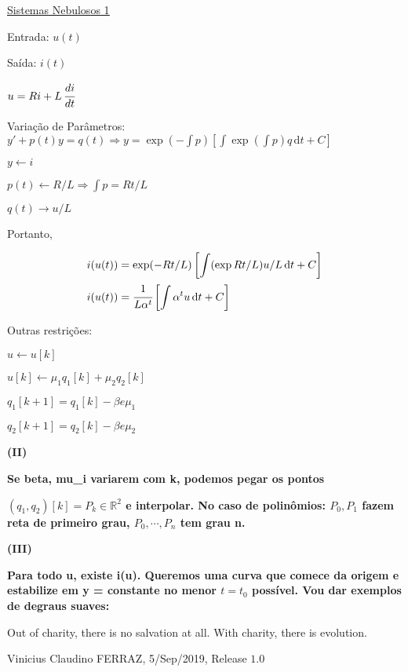 \documentclass[12pt]{article}
\begin{document}
\Large

\begin{center}
\href{https://www.youtube.com/watch?v=2E0TYW42x1c}{\color{blue}\underline{Sistemas Nebulosos 1}}
\end{center}

\normalsize

\vspace{3mm}

Entrada: $u(t)$

Sa\'ida: $i(t)$

$u = Ri + L\, \cfrac{di}{dt}$

Varia\c{c}\~ao de Par\^ametros: $y' + p(t) y = q(t) \Rightarrow y = \exp(-\int p) \left[ \int \exp (\int p) q \,\mathrm{d}t + C \right]$

$y \leftarrow i$

$p(t) \leftarrow R/L \Rightarrow \int p = Rt/L$

$q(t) \rightarrow u/L$

Portanto,

\begin{align}
 i(u(t)) &= \exp(-Rt/L) \left[ \int (\exp Rt/L) u/L \,\mathrm{d}t + C \right] \\
 i(u(t)) &= \cfrac{1}{L \alpha^t} \left[ \int \alpha^t u \,\mathrm{d}t + C \right]
\end{align}

Outras restri\c{c}\~oes:

$u \leftarrow u[k]$

$u[k] \leftarrow \mu_1 q_1[k] + \mu_2 q_2[k]$

$q_1[k+1] = q_1[k] - \beta e \mu_1$

$q_2[k+1] = q_2[k] - \beta e \mu_2$

\vspace{3mm}

\textbf{(II)}

\textbf{Se beta, mu\_i variarem com k, podemos pegar os pontos}

\textbf{$(q_1, q_2)[k] = P_k \in \mathbb{R}^2$ e interpolar. No caso de polin\^omios: $P_0, P_1$ fazem reta de primeiro grau, $P_0, \cdots, P_n$ tem grau n.}

\vspace{3mm}

\textbf{(III)}

\textbf{Para todo u, existe i(u). Queremos uma curva que comece da origem e estabilize em y = constante no menor $t = t_0$ poss\'ivel. Vou dar exemplos de degraus suaves:}

\vspace{3mm}

Out of charity, there is no salvation at all. With charity, there is evolution.

\vspace{3mm}

Vinicius Claudino FERRAZ, 5/Sep/2019, Release $1.0$
\end{document}
